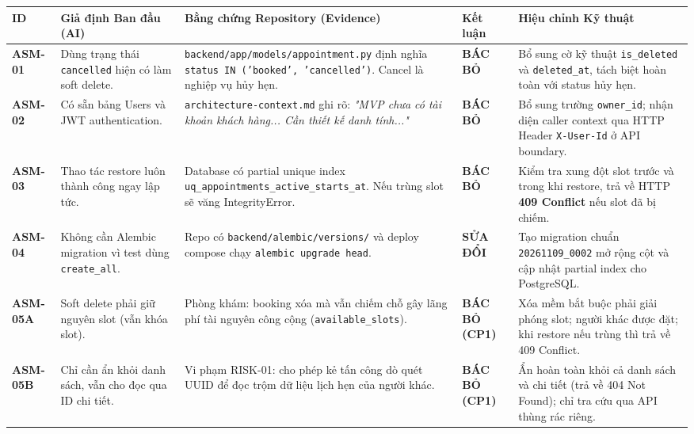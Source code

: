 \documentclass[10pt,a4paper]{article}
\newcommand{\hd}[1]{\sffamily\bfseries\scriptsize #1}
\newcommand{\codepath}[1]{{\ttfamily\scriptsize\nolinkurl{#1}}}
\begin{document}
\vspace{0.8pt}
\scriptsize
\begin{tabularx}{\linewidth}{@{}P{1.0cm}P{3.2cm}P{3.3cm}P{1.8cm}Y@{}}
\toprule
{}\hd{ID} & \hd{Giả định Ban đầu (AI)} & \hd{Bằng chứng Repository (Evidence)} & \hd{Kết luận} & \hd{Hiệu chỉnh Kỹ thuật} \\
\midrule
\textbf{ASM-01} & Dùng trạng thái \texttt{cancelled} hiện có làm soft delete. & \codepath{backend/app/models/appointment.py} định nghĩa \texttt{status IN ('booked', 'cancelled')}. Cancel là nghiệp vụ hủy hẹn. & \textbf{BÁC BỎ} & Bổ sung cờ kỹ thuật \texttt{is\_deleted} và \texttt{deleted\_at}, tách biệt hoàn toàn với status hủy hẹn. \\
\addlinespace[0.2pt]
\textbf{ASM-02} & Có sẵn bảng Users và JWT authentication. & \codepath{architecture-context.md} ghi rõ: \textit{"MVP chưa có tài khoản khách hàng... Cần thiết kế danh tính..."} & \textbf{BÁC BỎ} & Bổ sung trường \texttt{owner\_id}; nhận diện caller context qua HTTP Header \texttt{X-User-Id} ở API boundary. \\
\addlinespace[0.2pt]
\textbf{ASM-03} & Thao tác restore luôn thành công ngay lập tức. & Database có partial unique index \texttt{uq\_appointments\_active\_starts\_at}. Nếu trùng slot sẽ văng IntegrityError. & \textbf{BÁC BỎ} & Kiểm tra xung đột slot trước và trong khi restore, trả về HTTP \textbf{409 Conflict} nếu slot đã bị chiếm. \\
\addlinespace[0.2pt]
\textbf{ASM-04} & Không cần Alembic migration vì test dùng \texttt{create\_all}. & Repo có \codepath{backend/alembic/versions/} và deploy compose chạy \texttt{alembic upgrade head}. & \textbf{SỬA ĐỔI} & Tạo migration chuẩn \texttt{20261109\_0002} mở rộng cột và cập nhật partial index cho PostgreSQL. \\
\addlinespace[0.2pt]
\textbf{ASM-05A} & Soft delete phải giữ nguyên slot (vẫn khóa slot). & Phòng khám: booking xóa mà vẫn chiếm chỗ gây lãng phí tài nguyên công cộng (\codepath{available\_slots}). & \textbf{BÁC BỎ (CP1)} & Xóa mềm bắt buộc phải giải phóng slot; người khác được đặt; khi restore nếu trùng thì trả về 409 Conflict. \\
\addlinespace[0.2pt]
\textbf{ASM-05B} & Chỉ cần ẩn khỏi danh sách, vẫn cho đọc qua ID chi tiết. & Vi phạm RISK-01: cho phép kẻ tấn công dò quét UUID để đọc trộm dữ liệu lịch hẹn của người khác. & \textbf{BÁC BỎ (CP1)} & Ẩn hoàn toàn khỏi cả danh sách và chi tiết (trả về 404 Not Found); chỉ tra cứu qua API thùng rác riêng. \\
\bottomrule
\end{tabularx}
\end{document}
